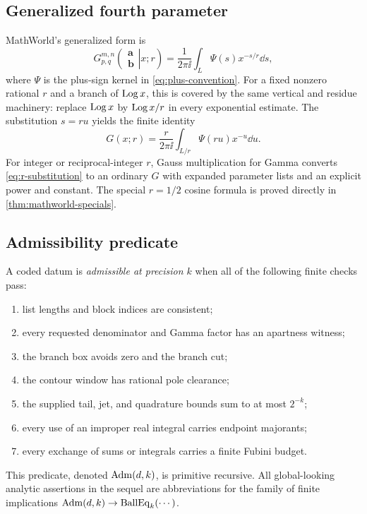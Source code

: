 \subsection{Generalized fourth parameter}

MathWorld's generalized form is
\begin{equation}\label{eq:r-general}
 G_{p,q}^{m,n}\!\left(\left.\begin{matrix}\mathbf a\\\mathbf b\end{matrix}
 \right|x;r\right)
 =\frac1{2\pi\ii}\int_L
 \Psi(s)x^{-s/r}\dd s,
\end{equation}
where $\Psi$ is the plus-sign kernel in \eqref{eq:plus-convention}.  For a fixed
nonzero rational $r$ and a branch of $\operatorname{Log} x$, this is covered by the same
vertical and residue machinery: replace $\operatorname{Log} x$ by $\operatorname{Log} x/r$ in every
exponential estimate.  The substitution $s=ru$ yields the finite identity
\begin{equation}\label{eq:r-substitution}
 G(x;r)=\frac{r}{2\pi\ii}\int_{L/r}\Psi(ru)x^{-u}\dd u.
\end{equation}
For integer or reciprocal-integer $r$, Gauss multiplication for Gamma converts
\eqref{eq:r-substitution} to an ordinary $G$ with expanded parameter lists and
an explicit power and constant.  The special $r=1/2$ cosine formula is proved
directly in \cref{thm:mathworld-specials}.

\subsection{Admissibility predicate}

A coded datum is \emph{admissible at precision $k$} when all of the following
finite checks pass:
\begin{enumerate}
\item list lengths and block indices are consistent;
\item every requested denominator and Gamma factor has an apartness witness;
\item the branch box avoids zero and the branch cut;
\item the contour window has rational pole clearance;
\item the supplied tail, jet, and quadrature bounds sum to at most $2^{-k}$;
\item every use of an improper real integral carries endpoint majorants;
\item every exchange of sums or integrals carries a finite Fubini budget.
\end{enumerate}
This predicate, denoted $\operatorname{Adm}(d,k)$, is primitive recursive.  All global-looking
analytic assertions in the sequel are abbreviations for the family of finite
implications $\operatorname{Adm}(d,k)\to\operatorname{BallEq}_k(\cdots)$.
